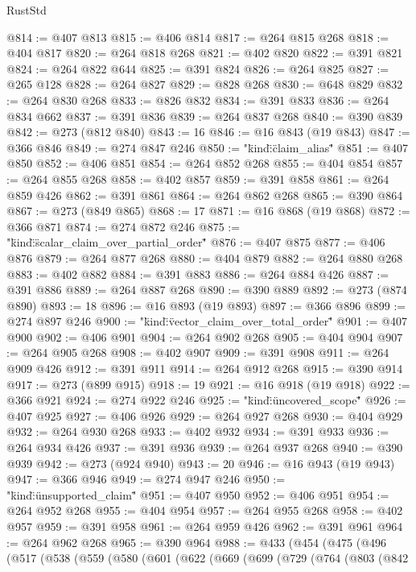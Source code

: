 \begin{lexlean}{RustStd}
\begin{coremodule}
{\begin{coremodule}
{{{{{{{{{{{{{{{{{{{{{{{{{{{{{{{{{{{{{{{{{{{{{{{{{{{{{{{{{{{{{{{{{{{{{{{{{{{{{{{{@814 := @407 @813
@815 := @406 @814
@817 := @264 @815 @268
@818 := @404 @817
@820 := @264 @818 @268
@821 := @402 @820
@822 := @391 @821
@824 := @264 @822 @644
@825 := @391 @824
@826 := @264 @825
@827 := @265 @128
@828 := @264 @827
@829 := @828 @268
@830 := @648 @829
@832 := @264 @830 @268
@833 := @826 @832
@834 := @391 @833
@836 := @264 @834 @662
@837 := @391 @836
@839 := @264 @837 @268
@840 := @390 @839
@842 := @273 (@812 @840)
@843 := 16
@846 := @16 @843 (@19 @843)
@847 := @366 @846
@849 := @274 @847 @246
@850 := "{\"kind\":\"claim_alias\""
@851 := @407 @850
@852 := @406 @851
@854 := @264 @852 @268
@855 := @404 @854
@857 := @264 @855 @268
@858 := @402 @857
@859 := @391 @858
@861 := @264 @859 @426
@862 := @391 @861
@864 := @264 @862 @268
@865 := @390 @864
@867 := @273 (@849 @865)
@868 := 17
@871 := @16 @868 (@19 @868)
@872 := @366 @871
@874 := @274 @872 @246
@875 := "{\"kind\":\"scalar_claim_over_partial_order\""
@876 := @407 @875
@877 := @406 @876
@879 := @264 @877 @268
@880 := @404 @879
@882 := @264 @880 @268
@883 := @402 @882
@884 := @391 @883
@886 := @264 @884 @426
@887 := @391 @886
@889 := @264 @887 @268
@890 := @390 @889
@892 := @273 (@874 @890)
@893 := 18
@896 := @16 @893 (@19 @893)
@897 := @366 @896
@899 := @274 @897 @246
@900 := "{\"kind\":\"vector_claim_over_total_order\""
@901 := @407 @900
@902 := @406 @901
@904 := @264 @902 @268
@905 := @404 @904
@907 := @264 @905 @268
@908 := @402 @907
@909 := @391 @908
@911 := @264 @909 @426
@912 := @391 @911
@914 := @264 @912 @268
@915 := @390 @914
@917 := @273 (@899 @915)
@918 := 19
@921 := @16 @918 (@19 @918)
@922 := @366 @921
@924 := @274 @922 @246
@925 := "{\"kind\":\"uncovered_scope\""
@926 := @407 @925
@927 := @406 @926
@929 := @264 @927 @268
@930 := @404 @929
@932 := @264 @930 @268
@933 := @402 @932
@934 := @391 @933
@936 := @264 @934 @426
@937 := @391 @936
@939 := @264 @937 @268
@940 := @390 @939
@942 := @273 (@924 @940)
@943 := 20
@946 := @16 @943 (@19 @943)
@947 := @366 @946
@949 := @274 @947 @246
@950 := "{\"kind\":\"unsupported_claim\""
@951 := @407 @950
@952 := @406 @951
@954 := @264 @952 @268
@955 := @404 @954
@957 := @264 @955 @268
@958 := @402 @957
@959 := @391 @958
@961 := @264 @959 @426
@962 := @391 @961
@964 := @264 @962 @268
@965 := @390 @964
@988 := @433
    (@454
      (@475
        (@496
          (@517
            (@538
              (@559
                (@580
                  (@601
                    (@622
                      (@669
                        (@699
                          (@729
                            (@764
                              (@803
                                (@842
}}}}}}}}}}}}}}}}}}}}}}}}}}}}}}}}}}}}}}}}}}}}}}}}}}}}}}}}}}}}}}}}}}}}}}}}}}}}}}}}}}}}}
\end{coremodule}}
\end{coremodule}
\end{lexlean}
